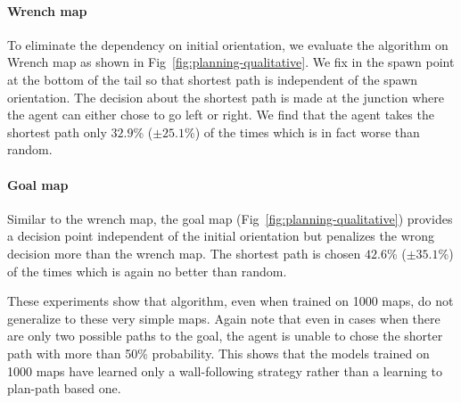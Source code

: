 \paragraph{Wrench map}
To eliminate the dependency on initial orientation, we evaluate the algorithm on Wrench map as shown in Fig~\ref{fig:planning-qualitative}. We fix in the spawn point at the bottom of the tail so that shortest path is independent of the spawn orientation.
The decision about the shortest path is made at the junction where the agent can either chose to go left or right.
We find that the agent takes the shortest path only $32.9$\% ($\pm 25.1$\%) of the times which is in fact worse than random.

\paragraph{Goal map}
Similar to the wrench map, the goal map (Fig~\ref{fig:planning-qualitative}) provides a decision point independent of the initial orientation but penalizes the wrong decision more than the wrench map. The shortest path is chosen $42.6$\% ($\pm 35.1$\%) of the times which is again no better than random.

These experiments show that \NavAiiiCDiDiiL{} algorithm, even when trained on 1000 maps, do not generalize to these very simple maps.
Again note that even in cases when there are only two possible paths to the goal, the agent is unable to chose the shorter path with more than 50\% probability.
This shows that the models trained on 1000 maps have learned only a wall-following strategy rather than a learning to plan-path based one.




